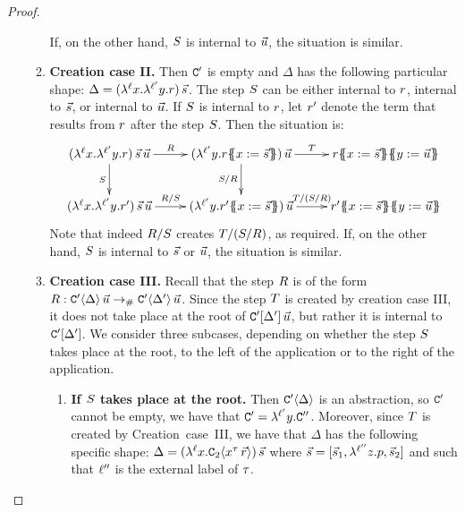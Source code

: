 \begin{proof}
\begin{enumerate}
\begin{enumerate}
    If, on the other hand, $S$ is internal to $\vec{u}$, the situation is similar.
  \item {\bf Creation case II.}
    Then $\mathtt{C}'$ is empty and $\Delta$ has the following particular shape:
    $\Delta = (\lambda^{\ell} x. \lambda^{\ell'} y. r)\,\vec{s}$.
    The step $S$ can be either internal to $r$, internal to $\vec{s}$,
    or internal to $\vec{u}$.
    If $S$ is internal to $r$, let $r'$ denote the term that results
    from $r$ after the step $S$. Then the situation is:
    \[
      \xymatrix{
        (\lamp{\lab}{\var}{\lamp{\labtwo}{\vartwo}{\tmfour}})\,\ls{\tmtwo}\,\ls{\tmthree}
        \ar[r]^-{\redex}
        \ar[d]_-{\redextwo}
      &
        (\lamp{\labtwo}{\vartwo}{\tmfour\sub{\var}{\ls{\tmtwo}}})\,\ls{\tmthree}
        \ar[d]_-{\redextwo/\redex}
        \ar[r]^-{\redexthree}
      &
        \tmfour\sub{\var}{\ls{\tmtwo}}\sub{\vartwo}{\ls{\tmthree}}
      \\
        (\lamp{\lab}{\var}{\lamp{\labtwo}{\vartwo}{\tmfour'}})\,\ls{\tmtwo}\,\ls{\tmthree}
        \ar[r]^-{\redex/\redextwo}
      &
        (\lamp{\labtwo}{\vartwo}{\tmfour'\sub{\var}{\ls{\tmtwo}}})\,\ls{\tmthree}
        \ar[r]^-{\redexthree/(\redextwo/\redex)}
      &
        \tmfour'\sub{\var}{\ls{\tmtwo}}\sub{\vartwo}{\ls{\tmthree}}
      }
    \]
    Note that indeed $R/S$ creates $T/(S/R)$, as required.
    If, on the other hand, $S$ is internal to $\vec{s}$ or $\vec{u}$, the situation is similar.
  \item {\bf Creation case III.}
    Recall that the step $R$ is of the form
    $R : \mathtt{C}'\langle\Delta\rangle\,\vec{u} \mathrel{\to_{\mathtt{\#}}} \mathtt{C}'\langle\Delta'\rangle\,\vec{u}$.
    Since the step $T$ is created by creation case III,
    it does not take place at the root of $\mathtt{C}'[\Delta']\,\vec{u}$,
    but rather it is internal to $\mathtt{C}'[\Delta']$.
    We consider three subcases, depending on whether the step $S$ takes place
    at the root, to the left of the application or to the right of the application.
    \begin{enumerate}
    \item {\bf If $S$ takes place at the root.}
      Then $\mathtt{C}'\langle\Delta\rangle$ is an abstraction,
      so $\mathtt{C}'$ cannot be empty, \ie we have that $\mathtt{C}' = \lambda^{\ell'} y. \mathtt{C}''$.
      Moreover, since $T$ is created by Creation~case~III,
      we have that $\Delta$ has the following specific shape:
      $\Delta = (\lambda^{\ell} x. \mathtt{C}_2\langle x^\tau\,\vec{r}\rangle)\,\vec{s}$
      where $\vec{s} = [\vec{s}_1,\lambda^{\ell''} z. p,\vec{s}_2]$
      and such that $\ell''$ is the external label of $\tau$.


\end{enumerate}
\end{enumerate}
\end{enumerate}
\end{proof}

